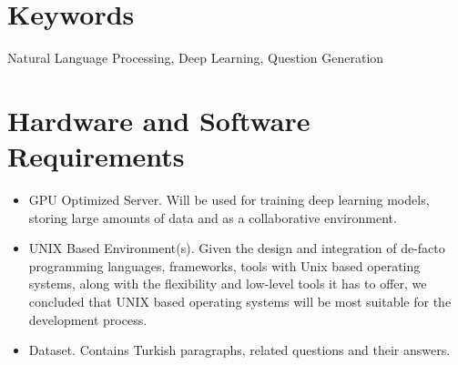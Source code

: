 \documentclass[10pt]{article}
\begin{document}
	
	\section{Keywords}
	Natural Language Processing, Deep Learning, Question Generation \newline \par
	
	\section{Hardware and Software Requirements}
	
	\begin{itemize}[label=\textcolor{darkazure}{\Large\textbullet}]
		\item GPU Optimized Server. Will be used for training deep learning models, storing large amounts of data and as a collaborative environment.
		
		\item UNIX Based Environment(s). Given the design and integration of de-facto programming languages, frameworks, tools with Unix based operating systems, along with the flexibility and low-level tools it has to offer, we concluded that UNIX based operating systems will be most suitable for the development process.
		
		\item Dataset.  Contains Turkish paragraphs, related questions and their answers.
	\end{itemize}
	
	
\end{document}
